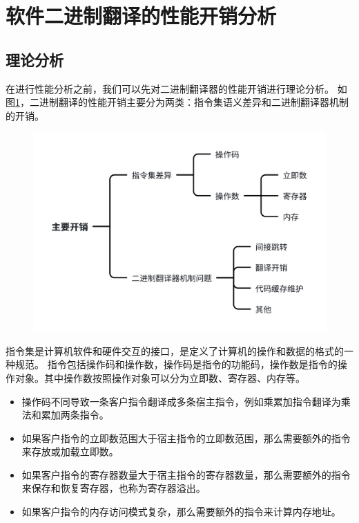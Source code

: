 \section{软件二进制翻译的性能开销分析}\label{sec:bt_overhead_all}

\subsection{理论分析}\label{sec:bt_overhead}

在进行性能分析之前，我们可以先对二进制翻译器的性能开销进行理论分析。
如图\ref{img:bt_overhead}，二进制翻译的性能开销主要分为两类：指令集语义差异和二进制翻译器机制的开销。

\begin{figure}[!htbp]
  \centering
  \includegraphics[width=0.7\linewidth]{./feishuImage/overhead_all.pdf}
  \label{img:bt_overhead}
\end{figure}

指令集是计算机软件和硬件交互的接口，是定义了计算机的操作和数据的格式的一种规范。
指令包括操作码和操作数，操作码是指令的功能码，操作数是指令的操作对象。其中操作数按照操作对象可以分为立即数、寄存器、内存等。
\begin{itemize}
\item 操作码不同导致一条客户指令翻译成多条宿主指令，例如乘累加指令翻译为乘法和累加两条指令。
\item 如果客户指令的立即数范围大于宿主指令的立即数范围，那么需要额外的指令来存放或加载立即数。
\item 如果客户指令的寄存器数量大于宿主指令的寄存器数量，那么需要额外的指令来保存和恢复寄存器，也称为寄存器溢出。
\item 如果客户指令的内存访问模式复杂，那么需要额外的指令来计算内存地址。
\end{itemize}

